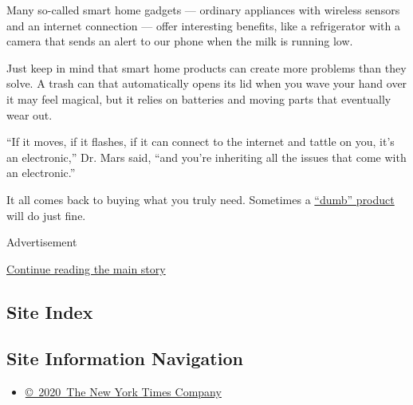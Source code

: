 Many so-called smart home gadgets --- ordinary appliances with wireless
sensors and an internet connection --- offer interesting benefits, like
a refrigerator with a camera that sends an alert to our phone when the
milk is running low.

Just keep in mind that smart home products can create more problems than
they solve. A trash can that automatically opens its lid when you wave
your hand over it may feel magical, but it relies on batteries and
moving parts that eventually wear out.

``If it moves, if it flashes, if it can connect to the internet and
tattle on you, it's an electronic,'' Dr. Mars said, ``and you're
inheriting all the issues that come with an electronic.''

It all comes back to buying what you truly need. Sometimes a
\href{https://www.nytimes3xbfgragh.onion/2018/02/21/technology/personaltech/smart-things-dumb-stuff.html}{``dumb''
product} will do just fine.

Advertisement

\protect\hyperlink{after-bottom}{Continue reading the main story}

\hypertarget{site-index}{%
\subsection{Site Index}\label{site-index}}

\hypertarget{site-information-navigation}{%
\subsection{Site Information
Navigation}\label{site-information-navigation}}

\begin{itemize}
\tightlist
\item
  \href{https://help.nytimes3xbfgragh.onion/hc/en-us/articles/115014792127-Copyright-notice}{©~2020~The
  New York Times Company}
\end{itemize}


